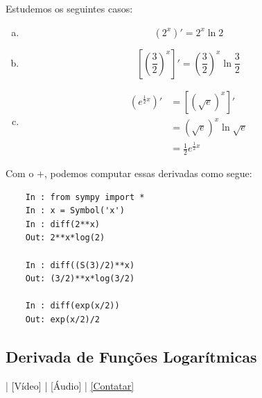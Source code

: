 \begin{ex}
  Estudemos os seguintes casos:
  \begin{enumerate}[a)]
  \item
    \begin{equation}
      \displaystyle\left(2^x\right)' = 2^x\ln 2
    \end{equation}
  \item
    \begin{equation}
      \displaystyle\left[\left(\frac{3}{2}\right)^x\right]' = \left(\frac{3}{2}\right)^x\ln\frac{3}{2}
    \end{equation}
  \item
    \begin{align}
      \displaystyle\left(e^{\frac{1}{2}x}\right)' &= \left[(\sqrt{e})^x\right]' \\
                                                  &= (\sqrt{e})^x\ln \sqrt{e}\\
                                                  &= \frac{1}{2}e^{\frac{1}{2}x}
    \end{align}
  \end{enumerate}
  \ifispython
  Com o {\python}+{\sympy}, podemos computar essas derivadas como segue:
  \begin{lstlisting}
    In : from sympy import *
    In : x = Symbol('x')
    In : diff(2**x)
    Out: 2**x*log(2)

    In : diff((S(3)/2)**x)
    Out: (3/2)**x*log(3/2)

    In : diff(exp(x/2))
    Out: exp(x/2)/2
  \end{lstlisting}
  \fi
\end{ex}

\subsection{Derivada de Funções Logarítmicas}

\begin{flushright}
  [YouTube] | [Vídeo] | [Áudio] | \href{https://phkonzen.github.io/notas/contato.html}{[Contatar]}
\end{flushright}

